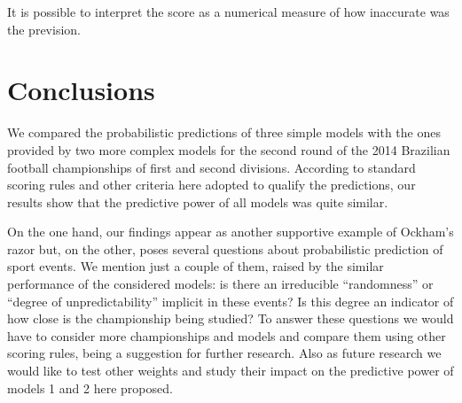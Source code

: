 \documentclass[journal,article,accept,moreauthors,pdftex,12pt,a4paper]{mdpi}
\begin{document}

It is possible to interpret the score as a numerical measure of how inaccurate was the 
prevision. 



\section{Conclusions}

We compared the probabilistic predictions of three simple models with the ones provided by two more complex models for the second round of the 2014 Brazilian football championships of first and second divisions.
According to standard scoring rules and other criteria here adopted to qualify the predictions, our results show that the predictive power of all models was quite similar.

On the one hand, our findings appear as another supportive example of Ockham's razor but, on the other, poses several questions about probabilistic prediction of sport events.
We mention just a couple of them, raised by the similar performance of the considered models: is there an irreducible ``randomness'' or ``degree of unpredictability'' implicit in these events?
Is this degree an indicator of how close is the championship being studied?
To answer these questions we would have to consider more championships and models and compare them using other scoring rules, being a suggestion for further research.
Also as future research we would like to test other weights and study their impact on the predictive power of models 1 and 2 here proposed.



\end{document}
